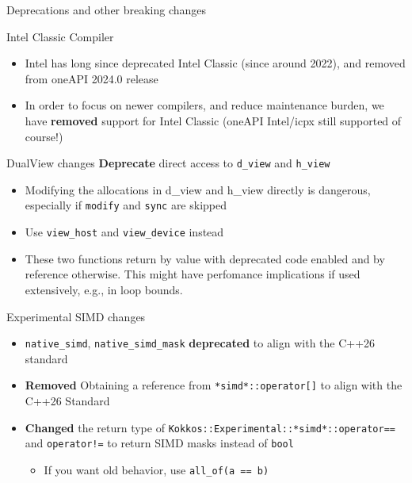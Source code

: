 
\begin{frame}[fragile]

  {\Huge Deprecations and other breaking changes}

  \vspace{10pt}

\end{frame}


\begin{frame}[fragile]{Intel Classic Compiler}
  \begin{itemize}
    \item Intel has long since deprecated Intel Classic (since around 2022), and removed from oneAPI 2024.0 release
    \item In order to focus on newer compilers, and reduce maintenance burden, we have \textbf{removed} support for Intel Classic (oneAPI Intel/icpx still supported of course!)
  \end{itemize}
\end{frame}


\begin{frame}[fragile]{DualView changes}
  \textbf{Deprecate} direct access to \texttt{d\_view} and \texttt{h\_view}
  \begin{itemize}
    \item Modifying the allocations in d\_view and h\_view directly is dangerous, especially if \texttt{modify} and \texttt{sync} are skipped
    \item Use \texttt{view\_host} and \texttt{view\_device} instead
    \item These two functions return by value with deprecated code enabled and by reference otherwise. This might have perfomance implications if used extensively, e.g., in loop bounds.
  \end{itemize}
\end{frame}


\begin{frame}[fragile]{Experimental SIMD changes}
  \begin{itemize}
    \item \texttt{native\_simd}, \texttt{native\_simd\_mask} \textbf{deprecated} to align with the C++26 standard
    \item \textbf{Removed} Obtaining a reference from \texttt{*simd*::operator[]} to align with the C++26 Standard
    \item \textbf{Changed} the return type of \texttt{Kokkos::Experimental::*simd*::operator==} and \texttt{operator!=} to return SIMD masks instead of \texttt{bool}
    \begin{itemize}
      \item If you want old behavior, use \texttt{all\_of(a == b)}
    \end{itemize}
  \end{itemize}
\end{frame}

